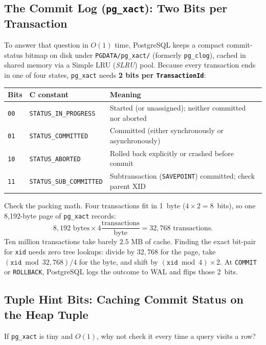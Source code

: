 \subsection{The Commit Log (\texttt{pg\_xact}): Two Bits per Transaction}

To answer that question in $O(1)$ time, PostgreSQL keeps a compact commit-status bitmap on disk under \texttt{PGDATA/pg\_xact/} (formerly \texttt{pg\_clog}), cached in shared memory via a Simple LRU (\emph{SLRU}) pool. Because every transaction ends in one of four states, \texttt{pg\_xact} needs \textbf{2 bits per \texttt{TransactionId}}:

\begin{center}
\small
\begin{tabular}{@{}llp{6.2cm}@{}}
\toprule
\textbf{Bits} & \textbf{C constant} & \textbf{Meaning} \\
\midrule
\texttt{00} & \texttt{STATUS\_IN\_PROGRESS} & Started (or unassigned); neither committed nor aborted \\
\texttt{01} & \texttt{STATUS\_COMMITTED} & Committed (either synchronously or asynchronously) \\
\texttt{10} & \texttt{STATUS\_ABORTED} & Rolled back explicitly or crashed before commit \\
\texttt{11} & \texttt{STATUS\_SUB\_COMMITTED} & Subtransaction (\texttt{SAVEPOINT}) committed; check parent XID \\
\bottomrule
\end{tabular}
\end{center}

Check the packing math. Four transactions fit in 1~byte ($4 \times 2 = 8$~bits), so one 8,192-byte page of \texttt{pg\_xact} records:
\[
  8{,}192 \text{ bytes} \times 4 \frac{\text{transactions}}{\text{byte}} = 32{,}768 \text{ transactions.}
\]
Ten million transactions take barely $2.5\text{ MB}$ of cache. Finding the exact bit-pair for \texttt{xid} needs zero tree lookups: divide by $32{,}768$ for the page, take $(\texttt{xid} \bmod 32{,}768) / 4$ for the byte, and shift by $(\texttt{xid} \bmod 4) \times 2$. At \texttt{COMMIT} or \texttt{ROLLBACK}, PostgreSQL logs the outcome to WAL and flips those 2~bits.

\subsection{Tuple Hint Bits: Caching Commit Status on the Heap Tuple}

If \texttt{pg\_xact} is tiny and $O(1)$, why not check it every time a query visits a row?


